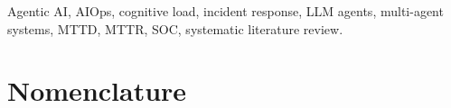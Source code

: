 \documentclass{ieeeaccess}
\begin{document}
\begin{keywords}
Agentic AI, AIOps, cognitive load, incident response, LLM agents,
multi-agent systems, MTTD, MTTR, SOC, systematic literature review.
\end{keywords}

\titlepgskip=-21pt

\maketitle

\section*{Nomenclature}
\label{sec:nomenclature}
\end{document}
